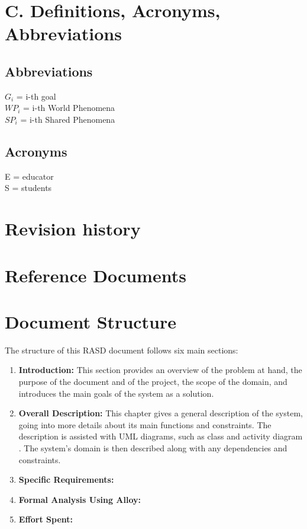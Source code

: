 \section{C. Definitions, Acronyms, Abbreviations}
\subsection{Abbreviations}
\(G_i\) = i-th goal \\
\(WP_i\) = i-th World Phenomena\\
\(SP_i\) = i-th Shared Phenomena\\

\subsection{Acronyms}
E = educator \\
S = students
\section{Revision history}
\section{Reference Documents}

\section{Document Structure}
The structure of this RASD document follows six main sections:
\begin{enumerate}
    \item \textbf{Introduction:}
            This section provides an overview of the problem at hand, the purpose of the document and of 
            the project, the scope of the domain, and introduces the main goals of the system as a solution.

    \item \textbf{Overall Description:}
            This chapter gives a general description of the system, going into more details about its main functions and constraints. 
            The description is assisted with UML diagrams, such as class and activity diagram . 
            The system’s domain is then described along with any dependencies and constraints.
    
    \item \textbf{Specific Requirements:}
    \item \textbf{Formal Analysis Using Alloy:}
    \item \textbf{Effort Spent:}
\end{enumerate}    
{\color{red}{I think that this section is not needed}}
